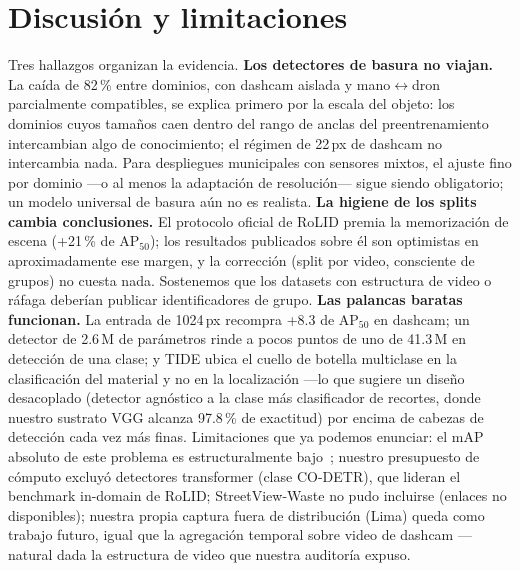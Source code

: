 \documentclass[conference]{IEEEtran}
\begin{document}
\section{Discusión y limitaciones}
Tres hallazgos organizan la evidencia. \textbf{Los detectores de basura no
viajan.} La caída de 82\,\% entre dominios, con dashcam aislada y
mano$\leftrightarrow$dron parcialmente compatibles, se explica primero por la
escala del objeto: los dominios cuyos tamaños caen dentro del rango de anclas
del preentrenamiento intercambian algo de conocimiento; el régimen de 22\,px de
dashcam no intercambia nada. Para despliegues municipales con sensores mixtos,
el ajuste fino por dominio ---o al menos la adaptación de resolución--- sigue
siendo obligatorio; un modelo universal de basura aún no es realista.
\textbf{La higiene de los splits cambia conclusiones.} El protocolo oficial de
RoLID premia la memorización de escena (+21\,\% de AP$_{50}$); los resultados
publicados sobre él son optimistas en aproximadamente ese margen, y la
corrección (split por video, consciente de grupos) no cuesta nada. Sostenemos
que los datasets con estructura de video o ráfaga deberían publicar
identificadores de grupo. \textbf{Las palancas baratas funcionan.} La entrada de
1024\,px recompra +8.3 de AP$_{50}$ en dashcam; un detector de 2.6\,M de
parámetros rinde a pocos puntos de uno de 41.3\,M en detección de una clase; y
TIDE ubica el cuello de botella multiclase en la clasificación del material y no
en la localización ---lo que sugiere un diseño desacoplado (detector agnóstico a
la clase más clasificador de recortes, donde nuestro sustrato VGG alcanza
97.8\,\% de exactitud) por encima de cabezas de detección cada vez más finas.
Limitaciones que ya podemos enunciar: el mAP absoluto de este problema es
estructuralmente bajo~\cite{trashdet}; nuestro presupuesto de cómputo excluyó
detectores transformer (clase CO-DETR), que lideran el benchmark in-domain de
RoLID; StreetView-Waste no pudo incluirse (enlaces no disponibles); nuestra
propia captura fuera de distribución (Lima) queda como trabajo futuro, igual que
la agregación temporal sobre video de dashcam ---natural dada la estructura de
video que nuestra auditoría expuso.

\end{document}
